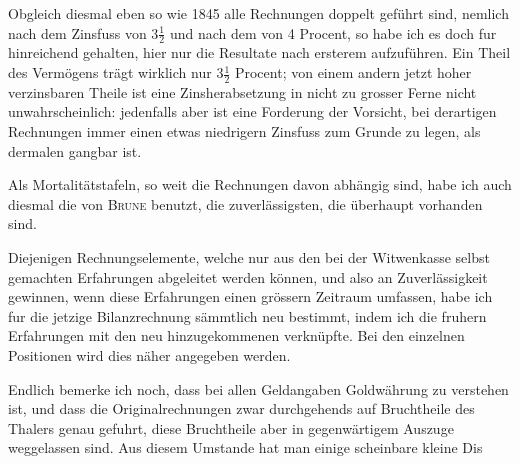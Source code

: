 Obgleich diesmal eben so wie 1845 alle Rechnungen doppelt geführt sind, nemlich nach dem Zinsfuss von \(3\tfrac{1}{2}\) und nach dem von 4 Procent, so habe ich es doch fur hinreichend gehalten, hier nur die Resultate nach ersterem aufzuführen. Ein Theil des Vermögens trägt wirklich nur \(3\tfrac{1}{2}\) Procent; von einem andern jetzt hoher verzinsbaren Theile ist eine Zinsherabsetzung in nicht zu grosser Ferne nicht unwahrscheinlich: jedenfalls aber ist eine Forderung der Vorsicht, bei derartigen Rechnungen immer einen etwas niedrigern Zinsfuss zum Grunde zu legen, als dermalen gangbar ist.

Als Mortalitätstafeln, so weit die Rechnungen davon abhängig sind, habe ich auch diesmal die von \textsc{Brune} benutzt, die zuverlässigsten, die überhaupt vorhanden sind.

Diejenigen Rechnungselemente, welche nur aus den bei der Witwenkasse selbst gemachten Erfahrungen abgeleitet werden können, und also an Zuverlässigkeit gewinnen, wenn diese Erfahrungen einen grössern Zeitraum umfassen, habe ich fur die jetzige Bilanzrechnung sämmtlich neu bestimmt, indem ich die fruhern Erfahrungen mit den neu hinzugekommenen verknüpfte. Bei den einzelnen Positionen wird dies näher angegeben werden.

Endlich bemerke ich noch, dass bei allen Geldangaben Goldwährung zu verstehen ist, und dass die Originalrechnungen zwar durchgehends auf Bruchtheile des Thalers genau gefuhrt, diese Bruchtheile aber in gegenwärtigem Auszuge weggelassen sind. Aus diesem Umstande hat man einige scheinbare kleine Dis%
